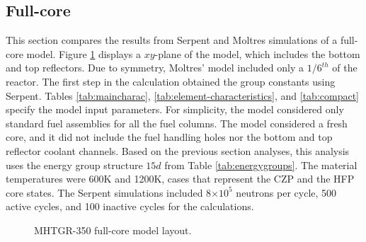 \subsection{Full-core}
\label{sec:neut-fullcore}

This section compares the results from Serpent and Moltres simulations of a full-core model.
Figure \ref{fig:fullcoremodel} displays a $xy$-plane of the model, which includes the bottom and top reflectors.
Due to symmetry, Moltres' model included only a $1/6^{th}$ of the reactor.
The first step in the calculation obtained the group constants using Serpent.
Tables \ref{tab:maincharac}, \ref{tab:element-characteristics}, and \ref{tab:compact} specify the model input parameters.
For simplicity, the model considered only standard fuel assemblies for all the fuel columns.
The model considered a fresh core, and it did not include the fuel handling holes nor the bottom and top reflector coolant channels.
Based on the previous section analyses, this analysis uses the energy group structure $15d$ from Table \ref{tab:energygroups}.
The material temperatures were 600K and 1200K, cases that represent the \gls{CZP} and the \gls{HFP} core states.
The Serpent simulations included 8$\times 10^5$ neutrons per cycle, 500 active cycles, and 100 inactive cycles for the calculations.

\begin{figure}[htbp!]
	\centering
	\hfill
  \caption{MHTGR-350 full-core model layout.}
	\label{fig:fullcoremodel}
\end{figure}

